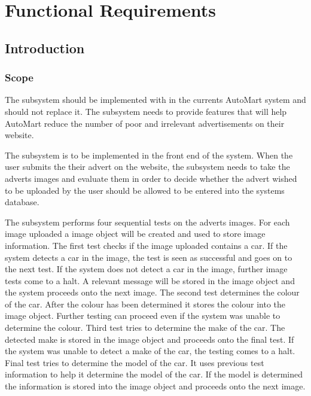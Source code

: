 \section{Functional Requirements}
\subsection{Introduction}

\subsubsection{Scope}
The subsystem should be implemented with in the currents AutoMart system and should not replace it. The subsystem needs to provide features that will help AutoMart reduce the number of poor and irrelevant advertisements on their website.

The subsystem is to be implemented in the front end of the system. When the user submits the their advert on the website, the subsystem needs to take the adverts images and evaluate them in order to decide whether the advert wished to be uploaded by the user should be allowed to be entered into the systems database.

The subsystem performs four sequential tests on the adverts images. For each image uploaded a image object will be created and used to store image information. The first test checks if the image uploaded contains a car. If the system detects a car in the image, the test is seen as successful and goes on to the next test. If the system does not detect a car in the image, further image tests come to a halt. A relevant message will be stored in the image object and the system proceeds onto the next image. The second test determines the colour of the car. After the colour has been determined it stores the colour  into the image object. Further testing can proceed even if the system was unable to determine the colour. Third test tries to determine the make of the car. The detected make is stored in the image object and proceeds onto the final test. If the system was unable to detect a make of the car, the testing comes to a halt. Final test tries to determine the model of the car. It uses previous test information to help it determine the model of the car. If the model is determined the information is stored into the image object and proceeds onto the next image.

